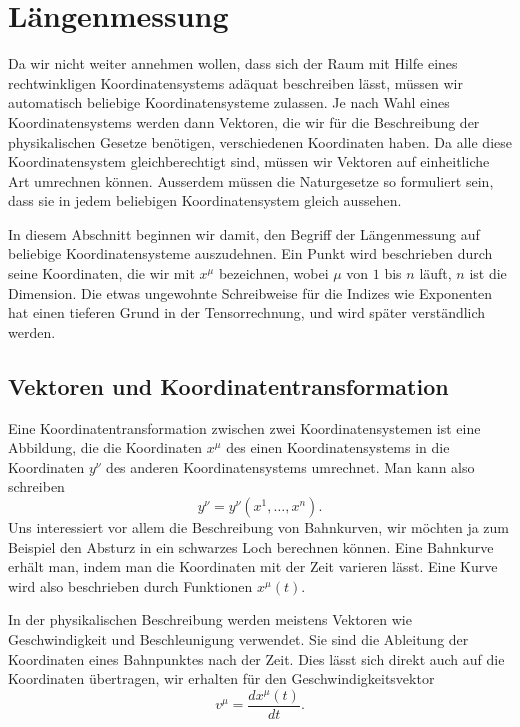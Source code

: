 %
%
%
\section{Längenmessung
\label{skript:kruemmung:section:laengenmessung}}
Da wir nicht weiter annehmen wollen, dass sich der Raum mit Hilfe
eines rechtwinkligen Koordinatensystems adäquat beschreiben lässt,
müssen wir automatisch beliebige Koordinatensysteme zulassen.
Je nach Wahl eines Koordinatensystems werden dann Vektoren, die
wir für die Beschreibung der physikalischen Gesetze benötigen,
verschiedenen Koordinaten haben.
Da alle diese Koordinatensystem gleichberechtigt sind, müssen
wir Vektoren auf einheitliche Art umrechnen können.
Ausserdem müssen die Naturgesetze so formuliert sein, dass
sie in jedem beliebigen Koordinatensystem gleich aussehen.

In diesem Abschnitt beginnen wir damit, den Begriff der Längenmessung
auf beliebige Koordinatensysteme auszudehnen.
Ein Punkt wird beschrieben durch seine Koordinaten, die wir mit
$x^\mu$ bezeichnen, wobei $\mu$ von $1$ bis $n$ läuft, $n$
ist die Dimension. 
Die etwas ungewohnte Schreibweise für die Indizes wie Exponenten
hat einen tieferen Grund in der Tensorrechnung, und wird später
verständlich werden.

\subsection{Vektoren und Koordinatentransformation}
Eine Koordinatentransformation zwischen zwei Koordinatensystemen ist
eine Abbildung, die die Koordinaten $x^\mu$ des einen Koordinatensystems
in die Koordinaten $y^\nu$ des anderen Koordinatensystems umrechnet.
Man kann also schreiben
\begin{equation}
y^{\nu}=y^{\nu}(x^1,\dots,x^n).
\label{skript:kruemmung:umrechnung}
\end{equation}
Uns interessiert vor allem die Beschreibung von Bahnkurven, wir möchten
ja zum Beispiel den Absturz in ein schwarzes Loch berechnen können.
Eine Bahnkurve erhält man, indem man die Koordinaten mit der Zeit
varieren lässt.
Eine Kurve wird also beschrieben durch Funktionen $x^\mu(t)$.

In der physikalischen Beschreibung werden meistens Vektoren wie
Geschwindigkeit und Beschleunigung verwendet.
Sie sind die Ableitung der Koordinaten eines Bahnpunktes nach
der Zeit.
Dies lässt sich direkt auch auf die Koordinaten übertragen,
wir erhalten für den Geschwindigkeitsvektor
\[
v^{\mu} = \frac{dx^\mu(t)}{dt}.
\]

